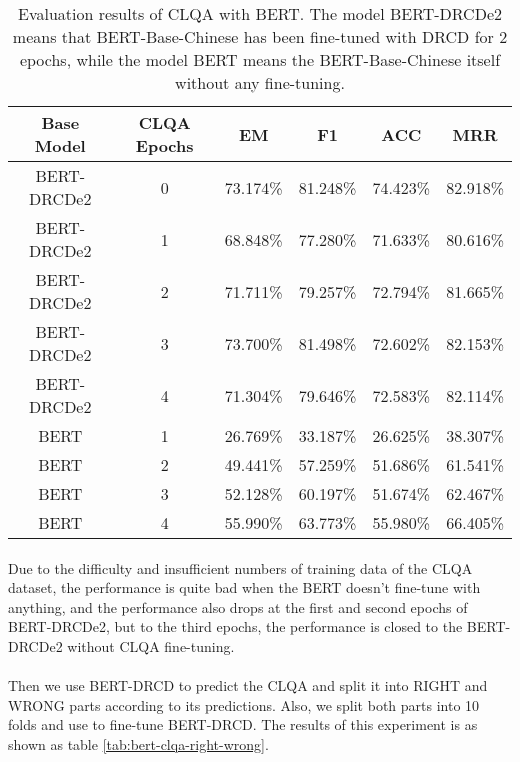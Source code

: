 \documentclass{article}
\begin{document}
\begin{table}[ht!]
  \centering
  \begin{tabular}{cccccc}
    Base Model & CLQA Epochs & EM & F1 & ACC & MRR\\
    \toprule
    BERT-DRCDe2 & 0 & 73.174\% & 81.248\% & 74.423\% & 82.918\% \\
    BERT-DRCDe2 & 1 & 68.848\% & 77.280\% & 71.633\% & 80.616\% \\
    BERT-DRCDe2 & 2 & 71.711\% & 79.257\% & 72.794\% & 81.665\% \\
    BERT-DRCDe2 & 3 & 73.700\% & 81.498\% & 72.602\% & 82.153\% \\
    BERT-DRCDe2 & 4 & 71.304\% & 79.646\% & 72.583\% & 82.114\% \\
    BERT        & 1 & 26.769\% & 33.187\% & 26.625\% & 38.307\% \\
    BERT        & 2 & 49.441\% & 57.259\% & 51.686\% & 61.541\% \\
    BERT        & 3 & 52.128\% & 60.197\% & 51.674\% & 62.467\% \\
    BERT        & 4 & 55.990\% & 63.773\% & 55.980\% & 66.405\% \\
  \end{tabular}
  \caption{Evaluation results of CLQA with BERT. The model BERT-DRCDe2 means that BERT-Base-Chinese has been fine-tuned with DRCD for 2 epochs, while the model BERT means the BERT-Base-Chinese itself without any fine-tuning.}
  \label{tab:bert-clqa}
\end{table}

\paragraph{}
Due to the difficulty and insufficient numbers of training data of the CLQA dataset, the performance is quite bad when the BERT doesn't fine-tune with anything, and the performance also drops at the first and second epochs of BERT-DRCDe2, but to the third epochs, the performance is closed to the BERT-DRCDe2 without CLQA fine-tuning.

\paragraph{}
Then we use BERT-DRCD to predict the CLQA and split it into RIGHT and WRONG parts according to its predictions. Also, we split both parts into 10 folds and use to fine-tune BERT-DRCD. The results of this experiment is as shown as table \ref{tab:bert-clqa-right-wrong}.
\end{document}
